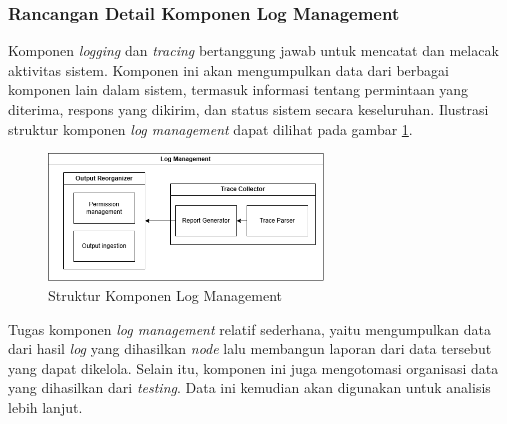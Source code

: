 \subsubsection{Rancangan Detail Komponen Log Management}
\label{subsubsection:detail-data-log-management}

Komponen \textit{logging} dan \textit{tracing} bertanggung jawab untuk mencatat dan melacak aktivitas sistem. Komponen ini akan mengumpulkan data dari berbagai komponen lain dalam sistem, termasuk informasi tentang permintaan yang diterima, respons yang dikirim, dan status sistem secara keseluruhan. Ilustrasi struktur komponen \textit{log management} dapat dilihat pada gambar \ref{fig:log-management-structure}.

\begin{figure}[ht]
    \centering
    \includegraphics[width=0.65\textwidth]{resources/chapter-3/log-management-architecture.png}
    \caption{Struktur Komponen Log Management}
    \label{fig:log-management-structure}
\end{figure}

Tugas komponen \textit{log management} relatif sederhana, yaitu mengumpulkan data dari hasil \textit{log} yang dihasilkan \textit{node} lalu membangun laporan dari data tersebut yang dapat dikelola. Selain itu, komponen ini juga mengotomasi organisasi data yang dihasilkan dari \textit{testing}. Data ini kemudian akan digunakan untuk analisis lebih lanjut.